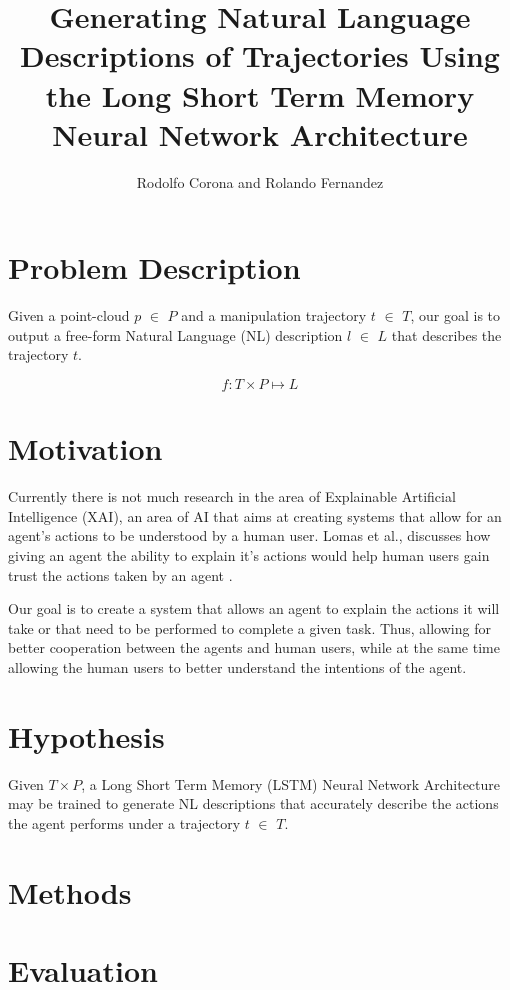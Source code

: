 \documentclass[letterpaper, 12 pt, conference]{ieeeconf}
\title{\LARGE \bf
Generating Natural Language Descriptions of Trajectories Using the Long Short Term Memory Neural Network Architecture}
\author{Rodolfo Corona and Rolando Fernandez}
\begin{document}
\maketitle
\thispagestyle{empty}
\pagestyle{empty}


\section{Problem Description}

Given a point-cloud $p$ $\in$ $P$ and a manipulation trajectory $t$ $\in$ $T$, our goal is to output a free-form  Natural Language (NL) description $l$ $\in$ $L$ that describes the trajectory $t$.

\begin{equation}
f: T\times P \mapsto L
\end{equation}

\section{Motivation}

Currently there is not much research in the area of Explainable Artificial Intelligence (XAI), an area of AI that aims at creating systems that allow for an agent's actions to be understood by a human user. Lomas et al., discusses how giving an agent the ability to explain it's actions would help human users gain trust the actions taken by an agent \cite{lomas2012explaining}.

Our goal is to create a system that allows an agent to explain the actions it will take or that need to be performed to complete a given task. Thus, allowing for better cooperation between the agents and human users, while at the same time allowing the human users to better understand the intentions of the agent.

\section{Hypothesis}

Given $T\times P$, a Long Short Term Memory (LSTM) Neural Network Architecture may be trained to generate NL descriptions that accurately describe the actions the agent performs under a trajectory $t$ $\in$ $T$.

\section{Methods}

\section{Evaluation}





\end{document}
